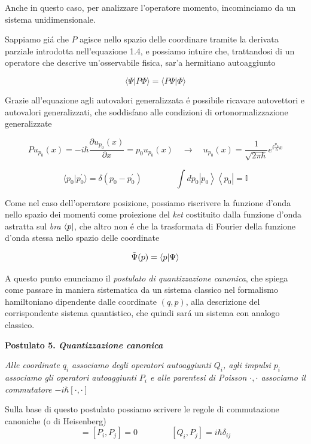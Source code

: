 Anche in questo caso, per analizzare l'operatore momento, incominciamo da un sistema unidimensionale.

Sappiamo gi\'a che $P$ agisce nello spazio delle coordinare tramite la derivata parziale introdotta nell'equazione 1.4, e possiamo intuire che, trattandosi di un operatore che descrive un'osservabile fisica, sar'a hermitiano autoaggiunto

$$\langle\Psi|P\Phi\rangle=\langle P\Psi|\Phi\rangle$$

Grazie all'equazione agli autovalori generalizzata \'e possibile ricavare autovettori e autovalori generalizzati, che soddisfano alle condizioni di ortonormalizzazione generalizzate

$$P u_{p_{0}}(x)=-i\hbar{\frac{\partial u_{p_{0}}(x)}{\partial x}}=p_{0}u_{p_{0}}(x)\quad\longrightarrow\quad u_{p_{0}}(x)={\frac{1}{\sqrt{2\pi\hbar}}}e^{i{\frac{p_{0}}{\hbar}}x}$$

$$\langle p_{0}|p_{0}^{\prime}\rangle=\delta(p_{0}-p_{0}^{\prime}) \qquad\qquad \int d p_{0}\left|p_{0}\right\rangle\left\langle p_{0}\right|=\mathbb{I}$$

Come nel caso dell'operatore posizione, possiamo riscrivere la funzione d'onda nello spazio dei momenti come proiezione del \textit{ket} costituito dalla funzione d'onda astratta sul \textit{bra} $\bra{p}$, che altro non \'e che la trasformata di Fourier della funzione d'onda stessa nello spazio delle coordinate 

$$\tilde{\Psi}(p) = \braket{p}{\Psi}$$

A questo punto enunciamo il \textit{postulato di quantizzazione canonica}, che spiega come passare in maniera sistematica da un sistema classico nel formalismo hamiltoniano dipendente dalle coordinate $(q, p)$, alla descrizione del corrispondente sistema quantistico, che quindi sar\'a un sistema con analogo classico. 

\textbf{Postulato 5. \textit{Quantizzazione canonica}}

\textit{Alle coordinate $q_i$ associamo degli operatori autoaggiunti $Q_i$, agli impulsi $p_i$ associamo gli operatori autoaggiunti $P_i$ e alle parentesi di Poisson ${\cdot, \cdot}$ associamo il commutatore $-i\hbar[\cdot, \cdot]$}

Sulla base di questo postulato possiamo scrivere le regole di commutazione canoniche (o di Heisenberg)
\begin{equation}
	[Q_{i},Q_{j}]=[P_{i},P_{j}]=0\qquad\qquad[Q_{i},P_{j}]=i\hbar\delta_{i j}
\end{equation}

